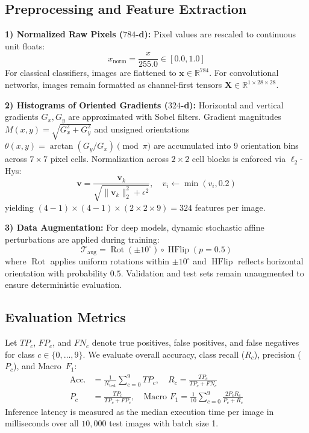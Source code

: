 \documentclass[conference]{IEEEtran}
\newcommand{\R}{\mathbb{R}}
\begin{document}
\subsection{Preprocessing and Feature Extraction}
\textbf{1) Normalized Raw Pixels ($784$-d):} Pixel values are rescaled to continuous unit floats:
\begin{equation}
x_{\text{norm}} = \frac{x}{255.0} \in [0.0, 1.0]
\end{equation}
For classical classifiers, images are flattened to $\mathbf{x} \in \R^{784}$. For convolutional networks, images remain formatted as channel-first tensors $\mathbf{X} \in \R^{1 \times 28 \times 28}$.

\textbf{2) Histograms of Oriented Gradients ($324$-d):} Horizontal and vertical gradients $G_x, G_y$ are approximated with Sobel filters. Gradient magnitudes $M(x, y) = \sqrt{G_x^2 + G_y^2}$ and unsigned orientations $\theta(x, y) = \arctan(G_y / G_x) \pmod \pi$ are accumulated into 9 orientation bins across $7 \times 7$ pixel cells. Normalization across $2 \times 2$ cell blocks is enforced via $\ell_2$-Hys:
\begin{equation}
\mathbf{v} = \frac{\mathbf{v}_k}{\sqrt{\|\mathbf{v}_k\|_2^2 + \epsilon^2}}, \quad v_i \leftarrow \min(v_i, 0.2)
\end{equation}
yielding $(4-1) \times (4-1) \times (2 \times 2 \times 9) = 324$ features per image.

\textbf{3) Data Augmentation:} For deep models, dynamic stochastic affine perturbations are applied during training:
\begin{equation}
\mathcal{T}_{\text{aug}} = \operatorname{Rot}(\pm 10^\circ) \circ \operatorname{HFlip}(p=0.5)
\end{equation}
where $\operatorname{Rot}$ applies uniform rotations within $\pm 10^\circ$ and $\operatorname{HFlip}$ reflects horizontal orientation with probability $0.5$. Validation and test sets remain unaugmented to ensure deterministic evaluation.

\subsection{Evaluation Metrics}
Let $TP_c$, $FP_c$, and $FN_c$ denote true positives, false positives, and false negatives for class $c \in \{0, \dots, 9\}$. We evaluate overall accuracy, class recall ($R_c$), precision ($P_c$), and Macro~$F_1$:
\begin{align}
\text{Acc.} &= \frac{1}{N_{\text{test}}} \sum_{c=0}^9 TP_c, \quad R_c = \frac{TP_c}{TP_c + FN_c} \\
P_c &= \frac{TP_c}{TP_c + FP_c}, \quad \text{Macro } F_1 = \frac{1}{10} \sum_{c=0}^9 \frac{2 P_c R_c}{P_c + R_c}
\end{align}
Inference latency is measured as the median execution time per image in milliseconds over all $10{,}000$ test images with batch size 1.
\end{document}

